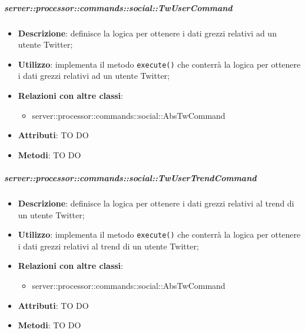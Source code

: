        \subparagraph{server::processor::commands::social::TwUserCommand} %
        \label{subp:bdsm_app_server_processor_commands_social_twusercommand}
        \begin{itemize}
          \item \textbf{Descrizione}: definisce la logica per ottenere i dati grezzi relativi ad un utente Twitter;
          \item \textbf{Utilizzo}: implementa il metodo \texttt{execute()} che conterrà la logica per ottenere i dati grezzi relativi ad un utente Twitter;
          \item \textbf{Relazioni con altre classi}:
            \begin{itemize}
              \item server::processor::commands::social::AbsTwCommand
            \end{itemize}
			\item \textbf{Attributi}: TO DO
			\item \textbf{Metodi}: TO DO
        \end{itemize}

        \subparagraph{server::processor::commands::social::TwUserTrendCommand} %
        \label{subp:bdsm_app_server_processor_commands_social_twusertrendcommand}
        \begin{itemize}
          \item \textbf{Descrizione}: definisce la logica per ottenere i dati grezzi relativi al trend di un utente Twitter;
          \item \textbf{Utilizzo}: implementa il metodo \texttt{execute()} che conterrà la logica per ottenere i dati grezzi relativi al trend di un utente Twitter;
          \item \textbf{Relazioni con altre classi}:
            \begin{itemize}
              \item server::processor::commands::social::AbsTwCommand
            \end{itemize}
			\item \textbf{Attributi}: TO DO
			\item \textbf{Metodi}: TO DO
        \end{itemize}

